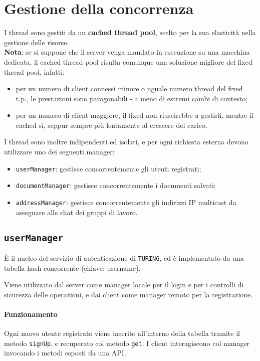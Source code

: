 \section{Gestione della concorrenza}
I thread sono gestiti da un \textbf{cached thread pool}, scelto per la sua elasticità nella gestione delle risorse. \\
\textbf{Nota}: se si suppone che il server venga mandato in esecuzione su una macchina dedicata, il cached thread pool risulta comunque una soluzione migliore del fixed thread pool, infatti:

\begin{itemize}
	\item per un numero di client connessi minore o uguale numero thread del fixed t.p., le prestazioni sono paragonabili - a meno di estremi cambi di contesto;
	\item per un numero di client maggiore, il fixed non riuscirebbe a gestirli, mentre il cached sì, seppur sempre più lentamente al crescere del carico.
\end{itemize} 

\medskip

I thread sono inoltre indipendenti ed isolati, e per ogni richiesta esterna devono utilizzare uno dei seguenti manager:

\begin{itemize}
	\item \texttt{userManager}: gestisce concorrentemente gli utenti registrati;
	\item \texttt{documentManager}: gestisce concorrentemente i documenti salvati;
	\item \texttt{addressManager}: gestisce concorrentemente gli indirizzi IP multicast da assegnare alle chat dei gruppi di lavoro.
\end{itemize}

\subsection{\texttt{userManager}}
È il nucleo del servizio di autenticazione di \texttt{TURING}, ed è implementato da una tabella hash concorrente (chiave: username).

Viene utilizzato dal server come manager locale per il login e per i controlli di sicurezza delle operazioni, e dai client come manager remoto per la registrazione.

\paragraph{Funzionamento}
Ogni nuovo utente registrato viene inserito all'interno della tabella tramite il metodo \texttt{signUp}, e recuperato col metodo \texttt{get}.
I client interagiscono col manager invocando i metodi esposti da una API.

